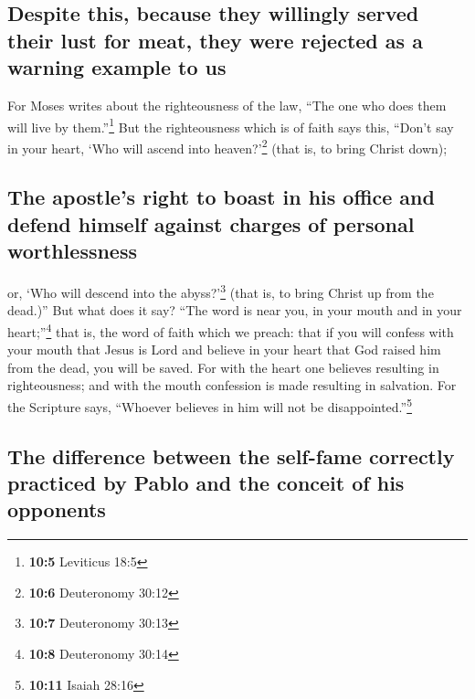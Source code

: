 \begin{paracol}{2}
\begin{otherlanguage}{english}
\hypertarget{despite-this-because-they-willingly-served-their-lust-for-meat-they-were-rejected-as-a-warning-example-to-us}{%
\subsection{Despite this, because they willingly served their lust for
meat, they were rejected as a warning example to
us}\label{despite-this-because-they-willingly-served-their-lust-for-meat-they-were-rejected-as-a-warning-example-to-us}}

 For Moses writes about the righteousness of the law,
``The one who does them will live by them.''\footnote{\textbf{10:5}
  Leviticus 18:5}  But the righteousness which is of faith
says this, ``Don't say in your heart, `Who will ascend into
heaven?'\footnote{\textbf{10:6} Deuteronomy 30:12} (that is, to bring
Christ down);

\hypertarget{the-apostles-right-to-boast-in-his-office-and-defend-himself-against-charges-of-personal-worthlessness}{%
\subsection{The apostle's right to boast in his office and defend
himself against charges of personal
worthlessness}\label{the-apostles-right-to-boast-in-his-office-and-defend-himself-against-charges-of-personal-worthlessness}}

 or, `Who will descend into the abyss?'\footnote{\textbf{10:7}
  Deuteronomy 30:13} (that is, to bring Christ up from the dead.)''
 But what does it say? ``The word is near you, in your
mouth and in your heart;''\footnote{\textbf{10:8} Deuteronomy 30:14}
that is, the word of faith which we preach:  that if you
will confess with your mouth that Jesus is Lord and believe in your
heart that God raised him from the dead, you will be saved.
 For with the heart one believes resulting in
righteousness; and with the mouth confession is made resulting in
salvation.  For the Scripture says, ``Whoever believes in
him will not be disappointed.''\footnote{\textbf{10:11} Isaiah 28:16}

\hypertarget{the-difference-between-the-self-fame-correctly-practiced-by-pablo-and-the-conceit-of-his-opponents}{%
\subsection{The difference between the self-fame correctly practiced by
Pablo and the conceit of his
opponents}\label{the-difference-between-the-self-fame-correctly-practiced-by-pablo-and-the-conceit-of-his-opponents}}


\end{otherlanguage}
\end{paracol}
